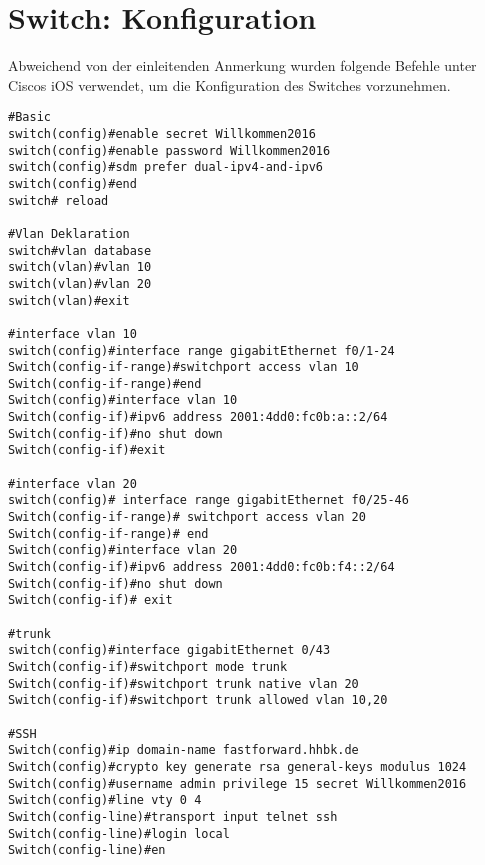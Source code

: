 \section{Switch: Konfiguration}

Abweichend von der einleitenden Anmerkung wurden folgende Befehle unter Ciscos iOS verwendet, um die Konfiguration des Switches vorzunehmen.

\begin{lstlisting}[numbers=none]
#Basic
switch(config)#enable secret Willkommen2016
switch(config)#enable password Willkommen2016
switch(config)#sdm prefer dual-ipv4-and-ipv6
switch(config)#end
switch# reload

#Vlan Deklaration
switch#vlan database 
switch(vlan)#vlan 10
switch(vlan)#vlan 20
switch(vlan)#exit

#interface vlan 10
switch(config)#interface range gigabitEthernet f0/1-24 
Switch(config-if-range)#switchport access vlan 10
Switch(config-if-range)#end
Switch(config)#interface vlan 10
Switch(config-if)#ipv6 address 2001:4dd0:fc0b:a::2/64
Switch(config-if)#no shut down
Switch(config-if)#exit

#interface vlan 20
switch(config)# interface range gigabitEthernet f0/25-46
Switch(config-if-range)# switchport access vlan 20
Switch(config-if-range)# end
Switch(config)#interface vlan 20
Switch(config-if)#ipv6 address 2001:4dd0:fc0b:f4::2/64
Switch(config-if)#no shut down
Switch(config-if)# exit

#trunk
switch(config)#interface gigabitEthernet 0/43
Switch(config-if)#switchport mode trunk
Switch(config-if)#switchport trunk native vlan 20
Switch(config-if)#switchport trunk allowed vlan 10,20

#SSH
Switch(config)#ip domain-name fastforward.hhbk.de
Switch(config)#crypto key generate rsa general-keys modulus 1024
Switch(config)#username admin privilege 15 secret Willkommen2016
Switch(config)#line vty 0 4
Switch(config-line)#transport input telnet ssh
Switch(config-line)#login local
Switch(config-line)#en
\end{lstlisting}
